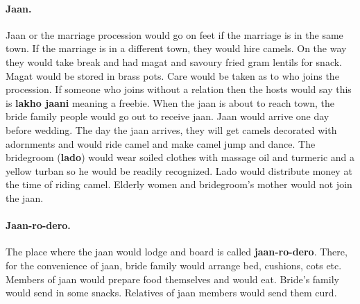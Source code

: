 \paragraph{Jaan.} Jaan or the marriage procession would go on feet if the
marriage is in the same town. If the marriage is in a different town, they
would hire camels. On the way they would take break and had magat and savoury
fried gram lentils for snack. Magat would be stored in brass pots. Care would
be taken as to who joins the procession. If someone who joins without a
relation then the hosts would say this is \textbf{lakho jaani} meaning a
freebie. When the jaan is about to reach town, the bride family people would go
out to receive jaan. Jaan would arrive one day before wedding. The day the jaan
arrives, they will get camels decorated with adornments and would ride camel
and make camel jump and dance. The bridegroom (\textbf{lado}) would wear soiled
clothes with massage oil and turmeric and a yellow turban so he would be
readily recognized. Lado would distribute money at the time of riding camel.
Elderly women and bridegroom's mother would not join the jaan.

\paragraph{Jaan-ro-dero.} The place where the jaan would lodge and board is
called \textbf{jaan-ro-dero}. There, for the convenience of jaan, bride family
would arrange bed, cushions, cots etc. Members of jaan would prepare food
themselves and would eat. Bride's family would send in some snacks. Relatives
of jaan members would send them curd.

